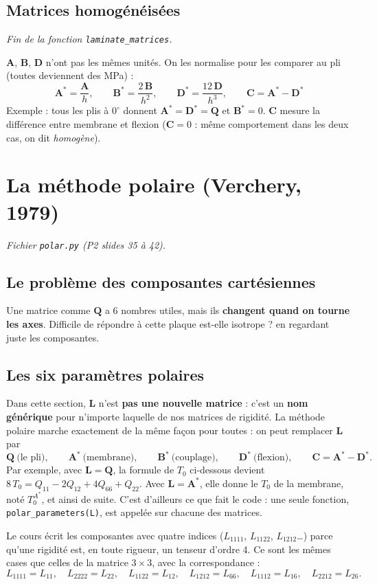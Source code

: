 \documentclass[11pt,a4paper]{article}
\newcommand{\As}{\mathbf{A}^{*}}
\newcommand{\Bs}{\mathbf{B}^{*}}
\newcommand{\Ds}{\mathbf{D}^{*}}
\newcommand{\Cm}{\mathbf{C}}
\newcommand{\Q}{\mathbf{Q}}
\newcommand{\code}[1]{\texttt{#1}}
\begin{document}
\subsection{Matrices homogénéisées}
\emph{Fin de la fonction \code{laminate\_matrices}.}

$\mathbf{A}$, $\mathbf{B}$, $\mathbf{D}$ n'ont pas les mêmes unités. On les
normalise pour les comparer au pli (toutes deviennent des MPa) :
\[
\boxed{\;\As = \frac{\mathbf{A}}{h},\qquad
\Bs = \frac{2\,\mathbf{B}}{h^2},\qquad
\Ds = \frac{12\,\mathbf{D}}{h^3},\qquad
\Cm = \As - \Ds\;}
\]
Exemple : tous les plis à $0^\circ$ donnent $\As = \Ds = \Q$ et $\Bs = 0$.
$\Cm$ mesure la différence entre membrane et flexion ($\Cm=0$ : même
comportement dans les deux cas, on dit \emph{homogène}).

\section{La méthode polaire (Verchery, 1979)}
\emph{Fichier \code{polar.py} (P2 slides 35 à 42).}

\subsection{Le problème des composantes cartésiennes}
Une matrice comme $\Q$ a 6 nombres utiles, mais ils \textbf{changent quand
on tourne les axes}. Difficile de répondre à \og cette plaque est-elle
isotrope ?\fg{} en regardant juste les composantes.

\subsection{Les six paramètres polaires}

\begin{idee}
Dans cette section, $\mathbf{L}$ n'est \textbf{pas une nouvelle matrice} :
c'est un \textbf{nom générique} pour \og n'importe laquelle de nos matrices
de rigidité\fg. La méthode polaire marche exactement de la même façon pour
toutes : on peut remplacer $\mathbf{L}$ par
\[
\Q\ \text{(le pli)},\qquad \As\ \text{(membrane)},\qquad \Bs\ \text{(couplage)},
\qquad \Ds\ \text{(flexion)},\qquad \Cm = \As - \Ds .
\]
Par exemple, avec $\mathbf{L} = \Q$, la formule de $T_0$ ci-dessous devient
$8\,T_0 = Q_{11} - 2Q_{12} + 4Q_{66} + Q_{22}$. Avec $\mathbf{L} = \As$,
elle donne le $T_0$ de la membrane, noté $T_0^{A^*}$, et ainsi de suite.
C'est d'ailleurs ce que fait le code : une seule fonction,
\code{polar\_parameters(L)}, est appelée sur chacune des matrices.

Le cours écrit les composantes avec quatre indices ($L_{1111}$, $L_{1122}$,
$L_{1212}$\ldots) parce qu'une rigidité est, en toute rigueur, un tenseur
d'ordre 4. Ce sont les mêmes cases que celles de la matrice $3\times3$, avec
la correspondance :
\[
L_{1111} = L_{11},\quad L_{2222} = L_{22},\quad L_{1122} = L_{12},\quad
L_{1212} = L_{66},\quad L_{1112} = L_{16},\quad L_{2212} = L_{26}.
\]
\end{idee}
\end{document}

